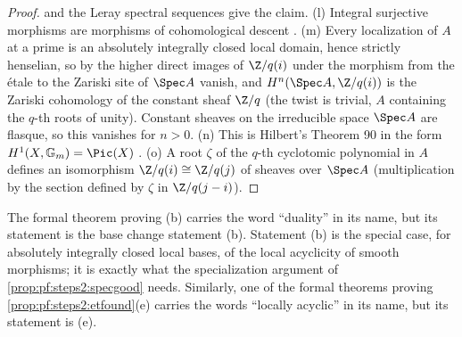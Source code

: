\begin{proof}
and the Leray spectral sequences give the claim.
(l) Integral surjective morphisms are morphisms of cohomological descent
\cite[Exp.~V\textsuperscript{bis}, 4.3.3(a)]{ArtinGrothendieckVerdier1972}.
(m) Every localization of $A$ at a prime is an absolutely integrally closed local domain, hence
strictly henselian, so by \cite[Exp.~VIII, 5.2, 4.7]{ArtinGrothendieckVerdier1972} the higher direct
images of $\Z/q(i)$ under the morphism from the \'etale to the Zariski site of $\Spec A$ vanish, and
$H^n(\Spec A,\Z/q(i))$ is the Zariski cohomology of the constant sheaf $\Z/q$ (the twist is trivial,
$A$ containing the $q$-th roots of unity). Constant sheaves on the irreducible space $\Spec A$ are
flasque, so this vanishes for $n>0$.
(n) This is Hilbert's Theorem 90 in the form $H^1(X,\mathbb G_m)=\Pic(X)$ \cite[Ch.~III, 4.9]{Milne1980}.
(o) A root $\zeta$ of the $q$-th cyclotomic polynomial in $A$ defines an isomorphism
$\Z/q(i)\cong\Z/q(j)$ of sheaves over $\Spec A$ (multiplication by the section defined by $\zeta$ in
$\Z/q(j-i)$).
\end{proof}
\begin{remark}\label{rem:pf:steps2:e3name}
The formal theorem proving (b) carries the word ``duality'' in its name, but its statement is the
base change statement (b). Statement (b) is the special case, for absolutely integrally closed local
bases, of the local acyclicity of smooth morphisms; it is exactly what the specialization argument
of \cref{prop:pf:steps2:specgood} needs. Similarly, one of the formal theorems proving
\cref{prop:pf:steps2:etfound}(e) carries the words ``locally acyclic'' in its name, but its statement is
(e).
\end{remark}

